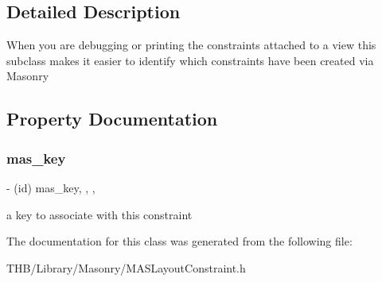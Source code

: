 \subsection{Detailed Description}
When you are debugging or printing the constraints attached to a view this subclass makes it easier to identify which constraints have been created via Masonry 

\subsection{Property Documentation}
\mbox{\label{interface_m_a_s_layout_constraint_a11b1c23ae0f604c661e4c86a9062fc19}} 
\subsubsection{\texorpdfstring{mas\+\_\+key}{mas\_key}}
{\footnotesize\ttfamily -\/ (id) mas\+\_\+key\hspace{0.3cm}{\ttfamily [read]}, {\ttfamily [write]}, {\ttfamily [nonatomic]}, {\ttfamily [strong]}}

a key to associate with this constraint 

The documentation for this class was generated from the following file\+:\begin{DoxyCompactItemize}
\item 
T\+H\+B/\+Library/\+Masonry/M\+A\+S\+Layout\+Constraint.\+h\end{DoxyCompactItemize}
